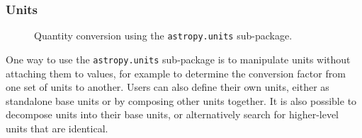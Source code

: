 \documentclass[traditabstract]{aa}
\begin{document}
\subsubsection{Units}

\begin{figure}
\center
\caption{Quantity conversion using the \texttt{astropy.units} sub-package.\label{code:quantities}}
\vspace{0.1in}
\end{figure}
\label{sec:units}

One way to use the \texttt{astropy.units} sub-package is to manipulate units
without attaching them to values, for example to determine the conversion
factor from one set of units to another. Users can also define their own
units, either as standalone base units or by composing other units together.
It is also possible to decompose units into their base units, or alternatively
search for higher-level units that are identical.
\end{document}
